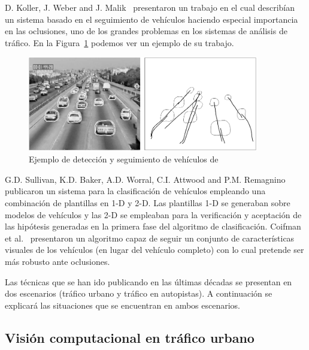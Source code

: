 D. Koller, J. Weber and J. Malik~\cite{robust_multiple} presentaron un trabajo en el cual describían un sistema basado en el seguimiento de vehículos haciendo especial importancia en las oclusiones, uno de los grandes problemas en los sistemas de análisis de tráfico. En la Figura~\ref{fig.koller_weber_walik_oclusion} podemos ver un ejemplo de su trabajo.

\begin{figure}[H]
  \begin{center}
    \includegraphics[width=0.9\textwidth]{figures/Introduccion/koller_weber_walik_oclusion.png}
		\caption{Ejemplo de detección y seguimiento de vehículos de~\cite{robust_multiple}}
		\label{fig.koller_weber_walik_oclusion}
		\end{center}
\end{figure}

G.D. Sullivan, K.D. Baker, A.D. Worral, C.I. Attwood and P.M. Remagnino~\cite{model_vehicle_detection} publicaron un sistema para la clasificación de vehículos empleando una combinación de plantillas en 1-D  y 2-D. Las plantillas 1-D se generaban sobre modelos de vehículos y las 2-D se empleaban para la verificación y aceptación de las hipótesis generadas en la primera fase del algoritmo de clasificación. Coifman et al.~\cite{areal_time} presentaron un algoritmo capaz de seguir un conjunto de características visuales de los vehículos (en lugar del vehículo completo) con lo cual pretende ser más robusto ante oclusiones.

Las técnicas que se han ido publicando en las últimas décadas se presentan en dos escenarios (tráfico urbano y tráfico en autopistas). A continuación se explicará las situaciones que se encuentran en ambos escenarios.

\subsection{Visión computacional en tráfico urbano}\label{ap.vision_computacion_urbano}

